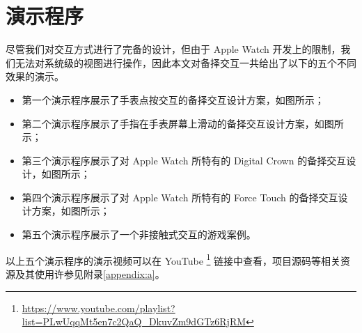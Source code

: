\section{演示程序}

尽管我们对交互方式进行了完备的设计，但由于 Apple Watch 开发上的限制，我们无法对系统级的视图进行操作，因此本文对备择交互一共给出了以下的五个不同效果的演示。

\begin{itemize}
    \kaishu
    \item 第一个演示程序展示了手表点按交互的备择交互设计方案，如图所示；
    \item 第二个演示程序展示了手指在手表屏幕上滑动的备择交互设计方案，如图所示；
    \item 第三个演示程序展示了对 Apple Watch 所特有的 Digital Crown 的备择交互设计，如图所示；
    \item 第四个演示程序展示了对 Apple Watch 所特有的 Force Touch 的备择交互设计方案，如图所示；
    \item 第五个演示程序展示了一个非接触式交互的游戏案例。
\end{itemize}

以上五个演示程序的演示视频可以在 YouTube
\footnote{\url{https://www.youtube.com/playlist?list=PLwUqqMt5en7c2QaQ_DkuvZm9dGTz6RjRM}}
链接中查看，项目源码等相关资源及其使用许参见附录\ref{appendix:a}。

\cleardoublepage
